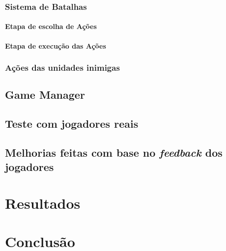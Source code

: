 \documentclass[
	12pt,				%
	openright,			%
	twoside,			%
	a4paper,			%
	english,			%
	french,				%
	spanish,			%
	brazil				%
	]{abntex2}
\begin{document}
\subsection{Sistema de Batalhas}

\subsubsection{Etapa de escolha de Ações}

\subsubsection{Etapa de execução das Ações}

\subsection{Ações das unidades inimigas}

\section{Game Manager}

\section{Teste com jogadores reais}

\section{Melhorias feitas com base no \emph{feedback} dos jogadores}

\chapter{Resultados}

\chapter{Conclusão}











%
%
\end{document}
